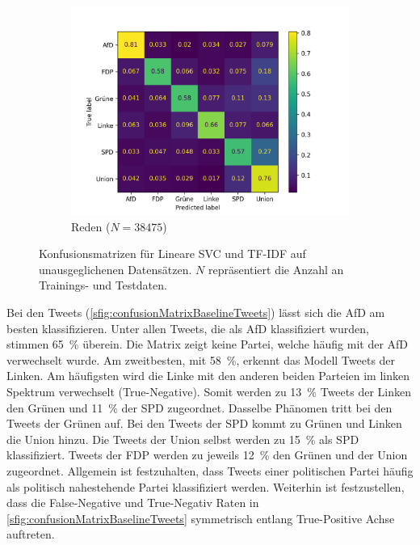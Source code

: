 \begin{figure}[H]
    \hfill
    \begin{subfigure}{0.49\textwidth}
        \includegraphics[width=\textwidth]{data/images/modeling/baseline/speeches_confusion_matrix.png}
        \caption{Reden (\(N=\num{38475}\))}
        \label{sfig:confusionMatrixBaselineSpeeches}
    \end{subfigure}
    \caption[Konfusionsmatrizen für Lineare \acs{SVC} mit \acs{TF-IDF} auf unausgeglichenen Datensätzen]{Konfusionsmatrizen für Lineare \acs{SVC} und \acs{TF-IDF} auf unausgeglichenen Datensätzen. $N$ repräsentiert die Anzahl an Trainings- und Testdaten.} \label{fig:confusionMatrixBaseline}
\end{figure}

Bei den Tweets (\autoref{sfig:confusionMatrixBaselineTweets}) lässt sich die \ac{AfD} am besten klassifizieren. Unter allen Tweets, die als \ac{AfD} klassifiziert wurden, stimmen \SI{65}{\percent} überein. Die Matrix zeigt keine Partei, welche häufig mit der \ac{AfD} verwechselt wurde. Am zweitbesten, mit \SI{58}{\percent}, erkennt das Modell Tweets der Linken. Am häufigsten wird die Linke mit den anderen beiden Parteien im linken Spektrum verwechselt (True-Negative). Somit werden zu \SI{13}{\percent} Tweets der Linken den Grünen und \SI{11}{\percent} der \ac{SPD} zugeordnet. Dasselbe Phänomen tritt bei den Tweets der Grünen auf. Bei den Tweets der \ac{SPD} kommt zu Grünen und Linken die Union hinzu. Die Tweets der Union selbst werden zu \SI{15}{\percent} als \ac{SPD} klassifiziert. Tweets der \ac{FDP} werden zu jeweils \SI{12}{\percent} den Grünen und der Union zugeordnet. Allgemein ist festzuhalten, dass Tweets einer politischen Partei häufig als politisch nahestehende Partei klassifiziert werden. Weiterhin ist festzustellen, dass die False-Negative und True-Negativ Raten in \autoref{sfig:confusionMatrixBaselineTweets} symmetrisch entlang True-Positive Achse auftreten.

